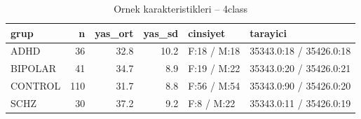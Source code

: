 \begin{table}[htbp]
  \centering
  \caption{Ornek karakteristikleri -- 4class}
  \label{tab:sample_4class}
  \small
  \begin{tabular}{lrrrll}
    \toprule
    grup & n & yas\_ort & yas\_sd & cinsiyet & tarayici \\
    \midrule
    ADHD & 36 & 32.8 & 10.2 & F:18 / M:18 & 35343.0:18 / 35426.0:18 \\
    BIPOLAR & 41 & 34.7 & 8.9 & F:19 / M:22 & 35343.0:20 / 35426.0:21 \\
    CONTROL & 110 & 31.7 & 8.8 & F:56 / M:54 & 35343.0:90 / 35426.0:20 \\
    SCHZ & 30 & 37.2 & 9.2 & F:8 / M:22 & 35343.0:11 / 35426.0:19 \\
    \bottomrule
  \end{tabular}
\end{table}
